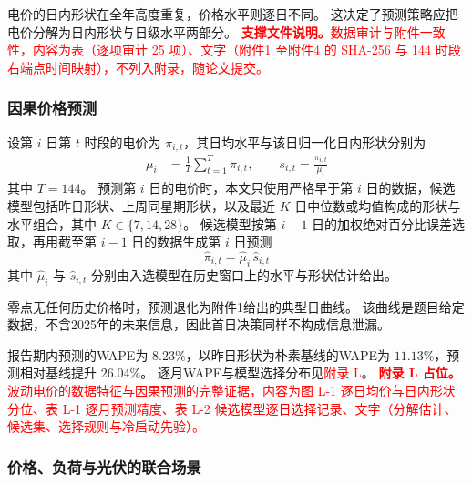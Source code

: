 电价的日内形状在全年高度重复，价格水平则逐日不同。
这决定了预测策略应把电价分解为日内形状与日级水平两部分。
\textcolor{red}{\textbf{支撑文件说明。}数据审计与附件一致性，内容为表（逐项审计 25 项）、文字（附件1 至附件4 的 SHA-256 与 144 时段右端点时间映射），不列入附录，随论文提交。}

\subsubsection{因果价格预测}

设第 \(i\) 日第 \(t\) 时段的电价为 \(\pi_{i,t}\)，其日均水平与该日归一化日内形状分别为
\begin{equation}
\begin{aligned}
\mu_i&=\frac{1}{T}\sum_{t=1}^{T}\pi_{i,t},
\qquad
s_{i,t}=\frac{\pi_{i,t}}{\mu_i}
\end{aligned}
\label{eq:q4_price_decomposition}
\end{equation}
其中 \(T=144\)。
预测第 \(i\) 日的电价时，本文只使用严格早于第 \(i\) 日的数据，候选模型包括昨日形状、上周同星期形状，以及最近 \(K\) 日中位数或均值构成的形状与水平组合，其中 \(K\in\{7,14,28\}\)。
候选模型按第 \(i-1\) 日的加权绝对百分比误差选取，再用截至第 \(i-1\) 日的数据生成第 \(i\) 日预测
\begin{equation}
\widehat\pi_{i,t}
=
\widehat\mu_i\,
\widehat s_{i,t}
\label{eq:q4_price_forecast}
\end{equation}
其中 \(\widehat\mu_i\) 与 \(\widehat s_{i,t}\) 分别由入选模型在历史窗口上的水平与形状估计给出。

零点无任何历史价格时，预测退化为附件1给出的典型日曲线。
该曲线是题目给定数据，不含2025年的未来信息，因此首日决策同样不构成信息泄漏。

报告期内预测的WAPE为 \(8.23\%\)，以昨日形状为朴素基线的WAPE为 \(11.13\%\)，预测相对基线提升 \(26.04\%\)。
逐月WAPE与模型选择分布见\textcolor{red}{附录 L}。
\textcolor{red}{\textbf{附录 L 占位。}波动电价的数据特征与因果预测的完整证据，内容为图 L-1 逐日均价与日内形状分位、表 L-1 逐月预测精度、表 L-2 候选模型逐日选择记录、文字（分解估计、候选集、选择规则与冷启动先验）。}

\subsubsection{价格、负荷与光伏的联合场景}

